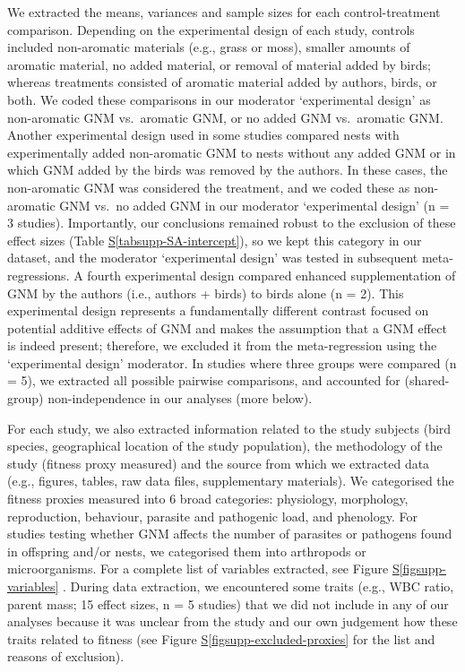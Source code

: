 \documentclass[
  number,
  review,
  onecolumn]{elsarticle}
\newcommand*\quartofigsuppref[1]{Figure \hyperref[#1]{S\ref{#1}}}
\newcommand*\quartotabsuppref[1]{Table \hyperref[#1]{S\ref{#1}}}
\begin{document}
We extracted the means, variances and sample sizes for each
control-treatment comparison. Depending on the experimental design of
each study, controls included non-aromatic materials (e.g., grass or
moss), smaller amounts of aromatic material, no added material, or
removal of material added by birds; whereas treatments consisted of
aromatic material added by authors, birds, or both. We coded these
comparisons in our moderator `experimental design' as non-aromatic GNM
vs.~aromatic GNM, or no added GNM vs.~aromatic GNM. Another experimental
design used in some studies compared nests with experimentally added
non-aromatic GNM to nests without any added GNM or in which GNM added by
the birds was removed by the authors. In these cases, the non-aromatic
GNM was considered the treatment, and we coded these as non-aromatic GNM
vs.~no added GNM in our moderator `experimental design' (n = 3 studies).
Importantly, our conclusions remained robust to the exclusion of these
effect sizes (\quartotabsuppref{tabsupp-SA-intercept}), so we kept this
category in our dataset, and the moderator `experimental design' was
tested in subsequent meta-regressions. A fourth experimental design
compared enhanced supplementation of GNM by the authors (i.e., authors +
birds) to birds alone (n = 2). This experimental design represents a
fundamentally different contrast focused on potential additive effects
of GNM and makes the assumption that a GNM effect is indeed present;
therefore, we excluded it from the meta-regression using the
`experimental design' moderator. In studies where three groups were
compared (n = 5), we extracted all possible pairwise comparisons, and
accounted for (shared-group) non-independence in our analyses (more
below).

For each study, we also extracted information related to the study
subjects (bird species, geographical location of the study population),
the methodology of the study (fitness proxy measured) and the source
from which we extracted data (e.g., figures, tables, raw data files,
supplementary materials). We categorised the fitness proxies measured
into 6 broad categories: physiology, morphology, reproduction,
behaviour, parasite and pathogenic load, and phenology. For studies
testing whether GNM affects the number of parasites or pathogens found
in offspring and/or nests, we categorised them into arthropods or
microorganisms. For a complete list of variables extracted, see
\quartofigsuppref{figsupp-variables} . During data extraction, we
encountered some traits (e.g., WBC ratio, parent mass; 15 effect sizes,
n = 5 studies) that we did not include in any of our analyses because it
was unclear from the study and our own judgement how these traits
related to fitness (see \quartofigsuppref{figsupp-excluded-proxies} for
the list and reasons of exclusion).
\end{document}
